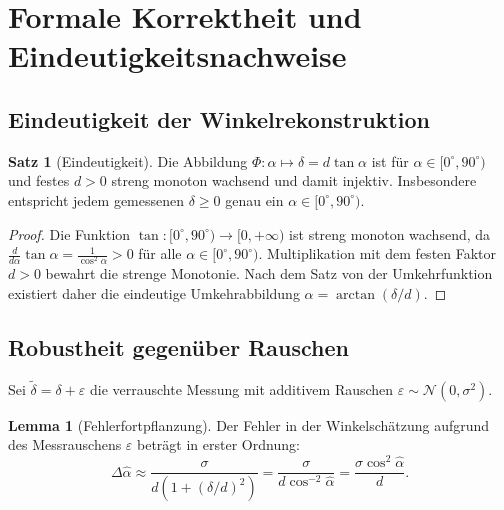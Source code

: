 ﻿\documentclass[a4paper,12pt]{article}
\theoremstyle{definition}
\newtheorem{satz}{Satz}
\newtheorem{lemma}{Lemma}
\begin{document}
\section{Formale Korrektheit und Eindeutigkeitsnachweise}

\subsection{Eindeutigkeit der Winkelrekonstruktion}

\begin{satz}[Eindeutigkeit]
  \label{satz:eindeutigkeit}
  Die Abbildung $\Phi: \alpha \mapsto \delta = d\tan\alpha$ ist für
  $\alpha \in [0^\circ, 90^\circ)$ und festes $d > 0$ streng monoton wachsend und damit
  injektiv. Insbesondere entspricht jedem gemessenen $\delta \geq 0$ genau ein
  $\alpha \in [0^\circ, 90^\circ)$.
\end{satz}

\begin{proof}
  Die Funktion $\tan: [0^\circ, 90^\circ) \to [0, +\infty)$ ist streng monoton wachsend,
  da $\frac{d}{d\alpha}\tan\alpha = \frac{1}{\cos^2\alpha} > 0$ für alle
  $\alpha \in [0^\circ, 90^\circ)$. Multiplikation mit dem festen Faktor $d > 0$ bewahrt
  die strenge Monotonie. Nach dem Satz von der Umkehrfunktion existiert daher
  die eindeutige Umkehrabbildung $\alpha = \arctan(\delta/d)$. \qedhere
\end{proof}

\subsection{Robustheit gegenüber Rauschen}

Sei $\tilde{\delta} = \delta + \varepsilon$ die verrauschte Messung mit
additivem Rauschen $\varepsilon \sim \mathcal{N}(0, \sigma^2)$.

\begin{lemma}[Fehlerfortpflanzung]
  \label{lem:fehler}
  Der Fehler in der Winkelschätzung aufgrund des Messrauschens $\varepsilon$
  beträgt in erster Ordnung:
  \[
    \Delta\hat{\alpha} \approx \frac{\sigma}{d(1 + (\delta/d)^2)}
    = \frac{\sigma}{d\cos^{-2}\hat{\alpha}}
    = \frac{\sigma \cos^2\hat{\alpha}}{d}.
  \]
\end{lemma}
\end{document}
